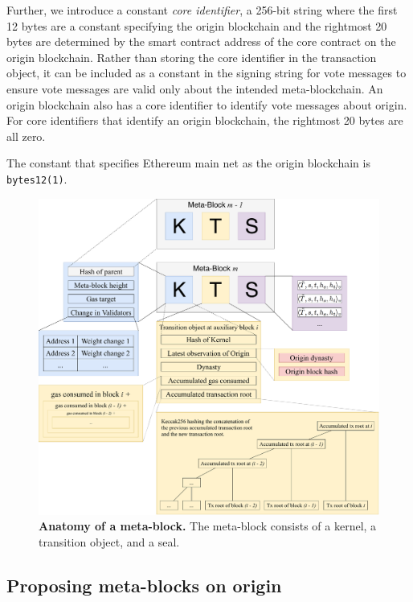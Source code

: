 \documentclass[12pt,a4paper]{article}
\begin{document}
Further, we introduce a constant \emph{core identifier}, a 256-bit string where the first 12 bytes are a constant specifying the origin blockchain and the rightmost 20 bytes are determined by the smart contract address of the core contract on the origin blockchain.
Rather than storing the core identifier in the transaction object, it can be included as a constant in the signing string for vote messages to ensure vote messages are valid only about the intended meta-blockchain.
An origin blockchain also has a core identifier to identify vote messages about origin.
For core identifiers that identify an origin blockchain, the rightmost 20 bytes are all zero.

The constant that specifies Ethereum main net as the origin blockchain is \texttt{bytes12(1)}.



\begin{figure}
    \centering
	\includegraphics[width=\textwidth]{meta_block}
	\caption{\textbf{Anatomy of a meta-block.}
		The meta-block consists of a kernel, a transition object, and a seal.
	}
	\label{fig:meta_block}
\end{figure}

\subsection{Proposing meta-blocks on origin}
\label{proposing_metablocks}
\end{document}

